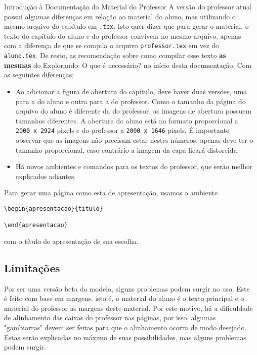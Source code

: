 \begin{apresentacao}{Introdução à Documentação do Material do Professor}
A versão do professor atual possui algumas diferenças em relação ao material do aluno, mas utilizando o mesmo arquivo do capítulo em \verb|.tex|. Isto quer dizer que para gerar o material, o texto do capítulo do aluno e do professor convivem no mesmo arquivo, apenas com a diferença de que se compila o arquivo \verb|professor.tex| em vez do \verb|aluno.tex|. De resto, as recomendação sobre como compilar esse texto \textbf{as mesmas} do \textcolor{session1}{Explorando: O que é necessário?} no início desta documentação. Com as seguintes diferenças:
\begin{itemize}
\item Ao adicionar a figura de abertura do capítulo, deve haver duas versões, uma para a do aluno e outra para a do professor. Como o tamanho da página do arquivo do aluno é diferente da do professor, as imagens de abertura possuem tamanhos diferentes. A abertura do aluno está no formato proporcional a \verb|2000 x 2924| pixels e do professor a \verb|2000 x 1646| pixels. É importante observar que as imagens não precisam estar nestes números, apenas deve ter o tamanho proporcional, caso contrário a imagem da capa ficará distorcida.

\item Há novos ambientes e comandos para os textos do professor, que serão melhor explicados adiantes.
\end{itemize}

Para gerar uma página como esta de apresentação, usamos o ambiente
\begin{verbatim}
\begin{apresentacao}{titulo}

\end{apresentacao}
\end{verbatim}
com o título de apresentação de sua escolha.  

\subsection{Limitações}
Por ser uma versão beta do modelo, alguns problemas podem surgir no uso. Este é feito com base em margens, isto é, o material do aluno é o texto principal e o material do professor as margens deste material. Por este motivo, há a dificuldade de alinhamento das caixas do professor nas páginas, por isso, algumas "gambiarras"{} devem ser feitas para que o alinhamento ocorra de modo desejado. Estas serão explicadas no máximo de suas possibilidades, mas alguns problemas podem surgir. 


\end{apresentacao}
